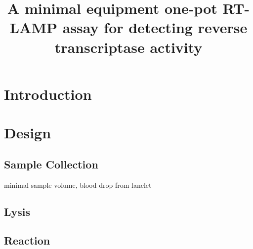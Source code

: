 \documentclass{article}
\title{A minimal equipment one-pot RT-LAMP assay for detecting reverse transcriptase activity}
\begin{document}
\maketitle
\newpage

\section{Introduction}

\section{Design}

\subsection{Sample Collection}

minimal sample volume, blood drop from lanclet 

\subsection{Lysis}

\cite{malmsten2005reverse}

\cite{karamohamed1998bioluminometric}

\cite{curtis2008rapid}

\subsection{Reaction}





\end{document}
